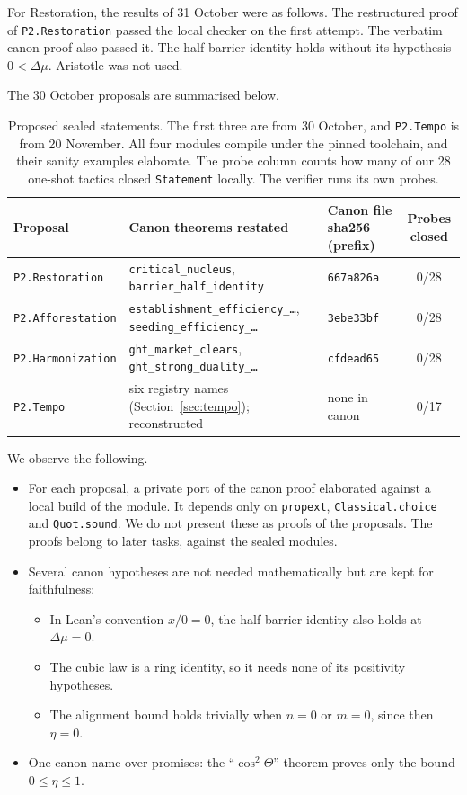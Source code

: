 \documentclass[11pt]{article}
\theoremstyle{definition}
\theoremstyle{remark}
\begin{document}
For Restoration, the results of 31 October were as follows.
The restructured proof of \texttt{P2.Restoration} passed the local checker on the first attempt.
The verbatim canon proof also passed it.
The half-barrier identity holds without its hypothesis $0<\Delta\mu$.
Aristotle was not used.

The 30 October proposals are summarised below.
\begin{table}[h]
\centering\small
\begin{tabular}{@{}p{}p{}lc@{}}
\toprule
Proposal & Canon theorems restated & Canon file sha256 (prefix) & Probes closed \\
\midrule
\texttt{P2.Restoration} & \texttt{critical\_nucleus}, \texttt{barrier\_half\_identity} & \texttt{667a826a} & 0/28 \\
\texttt{P2.Afforestation} & \texttt{establishment\_efficiency\_\ldots}, \texttt{seeding\_efficiency\_\ldots} & \texttt{3ebe33bf} & 0/28 \\
\texttt{P2.Harmonization} & \texttt{ght\_market\_clears}, \texttt{ght\_strong\_duality\_\ldots} & \texttt{cfdead65} & 0/28 \\
\texttt{P2.Tempo} & six registry names (Section~\ref{sec:tempo}); reconstructed & none in canon & 0/17 \\
\bottomrule
\end{tabular}
\caption{Proposed sealed statements. The first three are from 30 October, and \texttt{P2.Tempo} is from 20 November. All four modules compile under the pinned toolchain, and their sanity examples elaborate.
The probe column counts how many of our 28 one-shot tactics closed \texttt{Statement} locally. The verifier runs its own probes.}
\end{table}
We observe the following.
\begin{itemize}
\item For each proposal, a private port of the canon proof elaborated against a local build of the module.
It depends only on \texttt{propext}, \texttt{Classical.choice} and \texttt{Quot.sound}.
We do not present these as proofs of the proposals. The proofs belong to later tasks, against the sealed modules.
\item Several canon hypotheses are not needed mathematically but are kept for faithfulness:
\begin{itemize}
\item In Lean's convention $x/0=0$, the half-barrier identity also holds at $\Delta\mu=0$.
\item The cubic law is a ring identity, so it needs none of its positivity hypotheses.
\item The alignment bound holds trivially when $n=0$ or $m=0$, since then $\eta=0$.
\end{itemize}
\item One canon name over-promises: the ``$\cos^2\Theta$'' theorem proves only the bound $0\le\eta\le1$.
\end{itemize}
\end{document}
